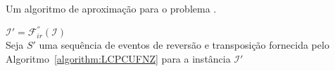 \begin{algorithm}[!tbh]
  \caption{Um algoritmo de aproximação para o problema \SbFIRT{}.\label{algorithm:KZFLZWRM}}
  $\mathcal{I}' = \mathcal{F}_{ir}^{''}(\mathcal{I})$ \\
  Seja $S'$ uma sequência de eventos de reversão e transposição fornecida pelo Algoritmo~\ref{algorithm:LCPCUFNZ} para a instância $\mathcal{I}'$ \\
\end{algorithm}